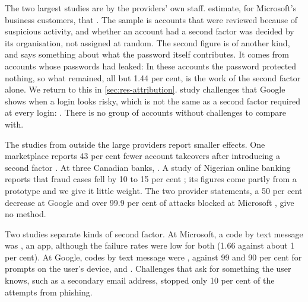 The two largest studies are by the providers' own staff.
\Textcite{Meyer2023MFAEffect} estimate, for Microsoft's business
customers, that
.
The sample is accounts that were reviewed because of suspicious
activity, and whether an account had a second factor was decided by its
organisation, not assigned at random.
The second figure is of another kind, and says something about what the
password itself contributes.
It comes from accounts whose passwords had leaked:
In these accounts the password protected nothing, so what remained, all
but 1.44 per cent, is the work of the second factor alone.
We return to this in \cref{sec:res-attribution}.
\Textcite{Doerfler2019LoginChallenges} study challenges that Google
shows when a login looks risky, which is not the same as a second factor
required at every login:
.
There is no group of accounts without challenges to compare with.

The studies from outside the large providers report smaller effects.
One marketplace reports 43 per cent fewer account takeovers after
introducing a second factor \autocite[\abso]{Kawase2019AccountTakeover}.
At three Canadian banks,
.
A study of Nigerian online banking reports that fraud cases fell by 10
to 15 per cent \autocite[\abso]{Egenti2026Nigeria}; its figures come
partly from a prototype and we give it little weight.
The two provider statements, a 50 per cent decrease at Google
\autocite{Google2022SaferInternet} and over 99.9 per cent of attacks
blocked at Microsoft \autocite{Maynes2019OneSimpleAction}, give no
method.

Two studies separate kinds of second factor.
At Microsoft, a code by text message was
, an app, although the failure rates were low
for both (1.66 against about 1 per cent).
At Google, codes by text message were
, against 99 and
90 per cent for prompts on the user's device, and
.
Challenges that ask for something the user knows, such as a secondary
email address, stopped only 10 per cent of the attempts from phishing.

